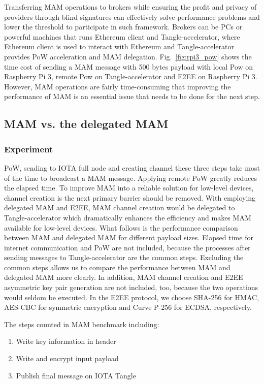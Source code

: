 \documentclass[conference]{IEEEtran}
\begin{document}
Transferring MAM operations to brokers while ensuring the profit and privacy of providers through blind signatures can effectively solve performance problems and lower the threshold to participate in such framework. Brokers can be PCs or powerful machines that runs Ethereum client and Tangle-accelerator, where Ethereum client is used to interact with Ethereum and Tangle-accelerator provides PoW acceleration and MAM delegation. Fig.~\ref{fig:rpi3_pow} shows the time cost of sending a MAM message with 500 bytes payload with local Pow on Raspberry Pi 3, remote Pow on Tangle-accelerator and E2EE on Raspberry Pi 3. However, MAM operations are fairly time-consuming that improving the performance of MAM is an essential issue that needs to be done for the next step.

\subsection{MAM vs. the delegated MAM}
\label{section:smart_contract_evaluation}

\subsubsection{Experiment}
PoW, sending to IOTA full node and creating channel these three steps take most of the time to broadcast a MAM message. Applying remote PoW greatly reduces the elapsed time. To improve MAM into a reliable solution for low-level devices, channel creation is the next primary barrier should be removed. With employing delegated MAM and E2EE, MAM channel creation would be delegated to Tangle-accelerator which dramatically enhances the efficiency and makes MAM available for low-level devices. What follows is the performance comparison between MAM and delegated MAM for different payload sizes. Elapsed time for internet communication and PoW are not included, because the processes after sending messages to Tangle-accelerator are the common steps. Excluding the common steps allows us to compare the performance between MAM and delegated MAM more clearly. In addition, MAM channel creation and E2EE asymmetric key pair generation are not included, too, because the two operations would seldom be executed. In the E2EE protocol, we choose SHA-256 for HMAC, AES-CBC for symmetric encryption and Curve P-256 for ECDSA, respectively.

The steps counted in MAM benchmark including:
\begin{enumerate}
    \item Write key information in header
	\item Write and encrypt input payload
	\item Publish final message on IOTA Tangle
\end{enumerate}
\end{document}
